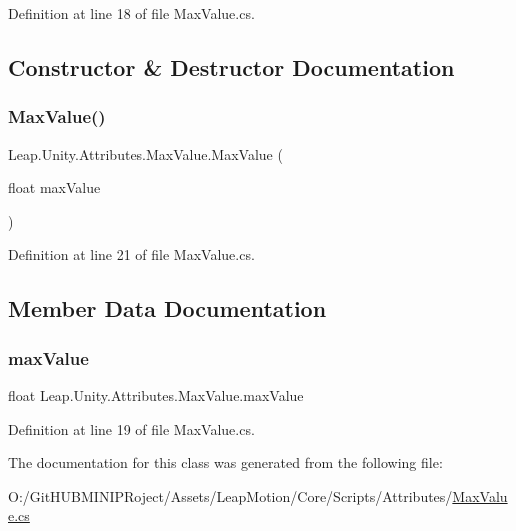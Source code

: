 Definition at line 18 of file Max\+Value.\+cs.



\subsection{Constructor \& Destructor Documentation}
\mbox{\label{class_leap_1_1_unity_1_1_attributes_1_1_max_value_a10106e003a1d79e9185a0c591f63efe8}} 
\subsubsection{\texorpdfstring{MaxValue()}{MaxValue()}}
{\footnotesize\ttfamily Leap.\+Unity.\+Attributes.\+Max\+Value.\+Max\+Value (\begin{DoxyParamCaption}\item[{float}]{max\+Value }\end{DoxyParamCaption})}



Definition at line 21 of file Max\+Value.\+cs.



\subsection{Member Data Documentation}
\mbox{\label{class_leap_1_1_unity_1_1_attributes_1_1_max_value_a24c71ceed3b711d05eb17b06395f22f2}} 
\subsubsection{\texorpdfstring{maxValue}{maxValue}}
{\footnotesize\ttfamily float Leap.\+Unity.\+Attributes.\+Max\+Value.\+max\+Value}



Definition at line 19 of file Max\+Value.\+cs.



The documentation for this class was generated from the following file\+:\begin{DoxyCompactItemize}
\item 
O\+:/\+Git\+H\+U\+B\+M\+I\+N\+I\+P\+Roject/\+Assets/\+Leap\+Motion/\+Core/\+Scripts/\+Attributes/\mbox{\hyperlink{_max_value_8cs}{Max\+Value.\+cs}}\end{DoxyCompactItemize}
